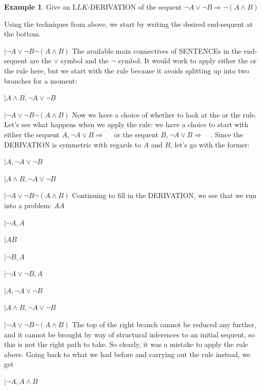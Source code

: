 \documentclass[10pt,a4paper]{article}
\newcommand*{\olup}[1]{\MakeUppercase{#1}}
\theoremstyle{plain}
\theoremstyle{definition}
\newtheorem{ex}[thm]{Example}
\theoremstyle{remark}
\providecommand{\AxiomC}[1]{}
\providecommand{\RightLabel}[1]{}
\providecommand{\fCenter}{}
\newenvironment{prooftree}{}{}
\providecommand{\Sequent}{\mathrel{\Rightarrow}}
\providecommand{\Log}{\ensuremath{\mathrm{L}}}
\providecommand{\LeftR}[1]{}
\providecommand{\RightR}[1]{}
\providecommand{\UnaryInf}{\ensuremath{\mid}}
\providecommand{\BinaryInf}{\ensuremath{\mid}}
\providecommand{\RightR}{\mathrm{R}}
\providecommand{\LeftR}{\mathrm{L}}
\providecommand{\Axiom}{\mathrm{Ax}}
\begin{document}
\begin{ex}
Give an $\Log{LK}$-\olup{derivation} of the sequent $\lnot A \lor \lnot B
\Sequent \lnot (A \land B)$

Using the techniques from above, we start by writing the desired
end-sequent at the bottom.
\begin{prooftree}
\AxiomC{}
\UnaryInf$ \lnot A \lor \lnot B \fCenter \lnot (A \land B) $
\end{prooftree}
The available main connectives of \olup{sentence}s in the end-sequent are
the $\lor$ symbol and the $\lnot$ symbol. It would work to apply
either the \LeftR{\lor} or the \RightR{\lnot} rule here, but we start
with the \RightR{\lnot} rule because it avoids splitting up into two
branches for a moment:
\begin{prooftree}
\AxiomC{}
\UnaryInf$A \land B, \lnot A \lor \lnot B \fCenter $
\RightLabel{\RightR{\lnot}}
\UnaryInf$\lnot A \lor \lnot B \fCenter \lnot (A \land B)$
\end{prooftree}
Now we have a choice of whether to look at the \LeftR{\land} or the
\LeftR{\lor} rule. Let's see what happens when we apply the \LeftR{\land}
rule: we have a choice to start with either the sequent $A,
\lnot A \lor B \Sequent \quad$ or the sequent $B, \lnot A
\lor B \Sequent \quad$. Since the \olup{derivation} is symmetric with
regards to $A$ and $B$, let's go with the former:
\begin{prooftree}
\AxiomC{}
\UnaryInf$A, \lnot A \lor \lnot B \fCenter $
\RightLabel{\LeftR{\land}}
\UnaryInf$A \land B, \lnot A \lor \lnot B \fCenter $
\RightLabel{\RightR{\lnot}}
\UnaryInf$\lnot A \lor \lnot B \fCenter \lnot (A \land B)$
\end{prooftree}
Continuing to fill in the \olup{derivation}, we see that we run into a problem:
\begin{prooftree}
\Axiom$A \fCenter A$
\RightLabel{\LeftR{\lnot}}
\UnaryInf$ \lnot A, A \fCenter$
\AxiomC{}
\RightLabel{?}
\UnaryInf$A \fCenter B$
\RightLabel{\LeftR{\lnot}}
\UnaryInf$ \lnot B, A \fCenter$
\RightLabel{\LeftR{\lor}}
\BinaryInf$\lnot A \lor \lnot B, A \fCenter $
\RightLabel{\LeftR{\Exchange}}
\UnaryInf$A, \lnot A \lor \lnot B \fCenter $
\RightLabel{\LeftR{\land}}
\UnaryInf$A \land B, \lnot A \lor \lnot B \fCenter $
\RightLabel{\RightR{\lnot}}
\UnaryInf$\lnot A \lor \lnot B \fCenter \lnot (A \land B)$
\end{prooftree}
The top of the right branch cannot be reduced any further, and it
cannot be brought by way of structural inferences to an initial
sequent, so this is not the right path to take. So clearly, it was a
mistake to apply the \LeftR{\land} rule above. Going back to what we
had before and carrying out the \LeftR{\lor} rule instead, we get
\begin{prooftree}
\AxiomC{}
\UnaryInf$\lnot A, A \land B \fCenter $


\end{prooftree}
\end{ex}
\end{document}
